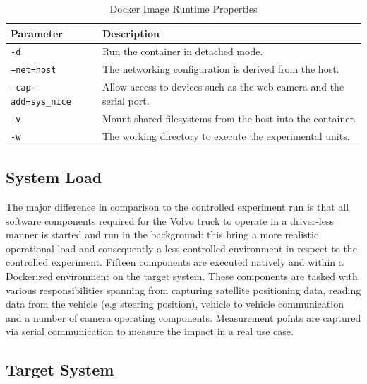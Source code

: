 \begin{table}[ht]
\begin{tabular}{|l|p{10cm}|}
\hline
\textbf{Parameter}           & \textbf{Description}                                            \\ \hline
\texttt{-d}                  & Run the container in detached mode.                             \\ \hline
\texttt{--net=host}          & The networking configuration is derived from the host.          \\ \hline
\texttt{--cap-add=sys\_nice} & Allow access to devices such as the web camera and the serial port. \\ \hline
\texttt{-v}                  & Mount shared filesystems from the host into the container.    \\ \hline
\texttt{-w}                  & The working directory to execute the experimental units.               \\ \hline
\end{tabular}
\centering
\caption{Docker Image Runtime Properties}
\label{docker-parameters-truck}
\end{table}


\subsection{System Load}
\label{sec:truck-load}

The major difference in comparison to the controlled experiment run is that all software components required for the Volvo truck to operate in a driver-less manner is started and run in the background: this bring a more realistic operational load and consequently a less controlled environment in respect to the controlled experiment. Fifteen components are executed natively and within a Dockerized environment on the target system. These components are tasked with various responsibilities spanning from capturing satellite positioning data, reading data from the vehicle (e.g steering position), vehicle to vehicle communication and a number of camera operating components. Measurement points are captured via serial communication to measure the impact in a real use case.\\

\subsection{Target System}
\label{sec:truck-target}


